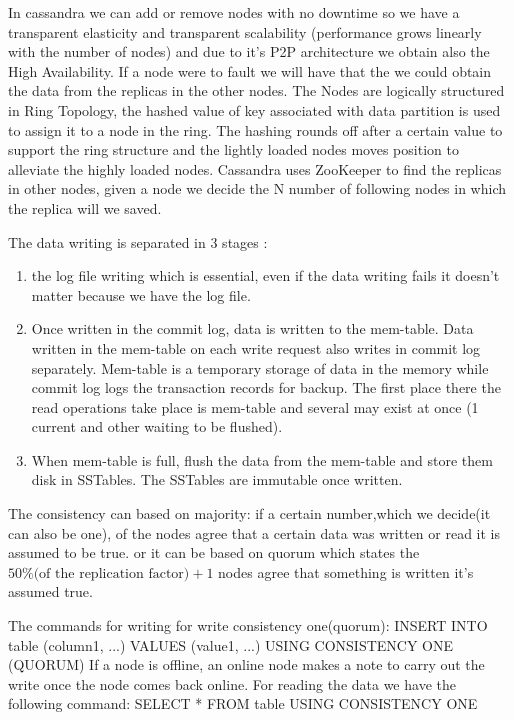 \documentclass[a4page, 11pt]{article}
\begin{document}
In cassandra we can add or remove nodes with no downtime so we have a transparent elasticity and transparent scalability (performance grows linearly with the number of nodes) and due to it's P2P architecture we obtain also the High Availability. If a node were to fault we will have that the we could obtain the data from the replicas in the other nodes.
The Nodes are logically structured in Ring Topology, the hashed value of key associated with data partition is used to assign it to a node in the ring. The hashing rounds off after a certain value to support the ring structure and the lightly loaded nodes moves position to alleviate the highly loaded nodes.
Cassandra uses ZooKeeper to find the replicas in other nodes, given a node we decide the N number of following nodes in which the replica will we saved.

The data writing is separated in 3 stages : 
\begin{enumerate}
	\item the log file writing which is essential, even if the data writing fails it doesn't matter because we have the log file.
	\item Once written in the commit log, data is written to the mem-table. Data written in the mem-table on each write request also writes in commit log separately. Mem-table is a temporary storage of data in the memory while commit log logs the transaction records for backup.
	\newline The first place there the read operations take place is mem-table and several may exist at once (1 current and other waiting to be flushed). 
	\item When mem-table is full, flush the data from the mem-table and store them disk in SSTables. The SSTables are immutable once written.
\end{enumerate}

The consistency can based on majority: if a certain number,which we decide(it can also be one), of the nodes agree that a certain data was written or read it is assumed to be true. \newline
or it can be based on quorum which states the $50\%\text{(of the replication factor)}+1$ nodes agree that something is written it's assumed true.

The commands for writing for write consistency one(quorum): \newline
INSERT INTO table (column1, ...) VALUES (value1, ...) USING CONSISTENCY ONE (QUORUM)\newline
If a node is offline, an online node makes a note to carry out the write once the node comes back online.
For reading the data we have the following command:
SELECT * FROM table USING CONSISTENCY ONE
\end{document}

